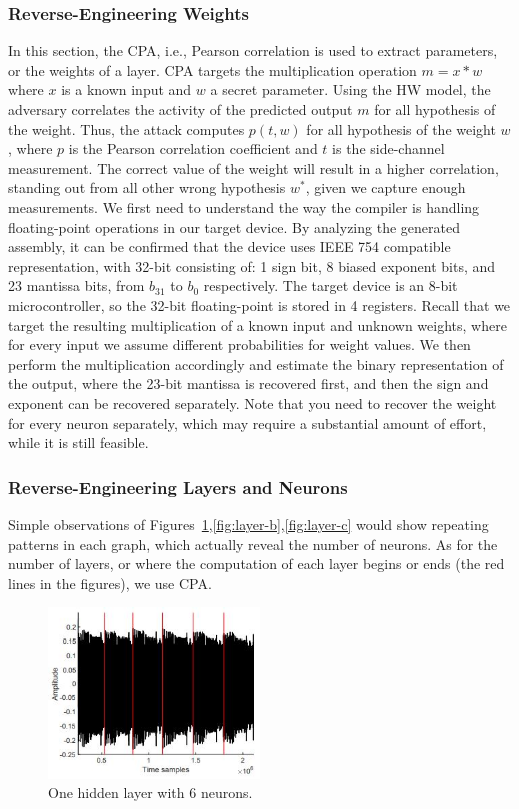 \subsubsection{Reverse-Engineering Weights}
In this section, the CPA, i.e., Pearson correlation is used to extract parameters, or the weights of a layer.
CPA targets the multiplication operation $m=x*w$ where $x$ is a known input and $w$ a secret parameter.
Using the HW model, the adversary correlates the activity of the predicted output $m$ for all hypothesis of the weight.
Thus, the attack computes $p(t, w)$ for all hypothesis of the weight $w$, where $p$ is the Pearson correlation coefficient and $t$ is the side-channel measurement.
The correct value of the weight will result in a higher correlation, standing out from all other wrong hypothesis $w^*$, given we capture enough measurements.
We first need to understand the way the compiler is handling floating-point operations in our target device.
By analyzing the generated assembly, it can be confirmed that the device uses IEEE 754 compatible representation, with 32-bit consisting of: 1 sign bit, 8 biased exponent bits, and 23 mantissa bits, from $b_31$ to $b_0$ respectively.
The target device is an 8-bit microcontroller, so the 32-bit floating-point is stored in 4 registers.
Recall that we target the resulting multiplication of a known input and unknown weights, where for every input we assume different probabilities for weight values.
We then perform the multiplication accordingly and estimate the binary representation of the output, where the 23-bit mantissa is recovered first, and then the sign and exponent can be recovered separately.
Note that you need to recover the weight for every neuron separately, which may require a substantial amount of effort, while it is still feasible.

\subsubsection{Reverse-Engineering Layers and Neurons}
Simple observations of Figures~\ref{fig:layer-a},\ref{fig:layer-b},\ref{fig:layer-c} would show repeating patterns in each graph, which actually reveal the number of neurons.
As for the number of layers, or where the computation of each layer begins or ends (the red lines in the figures), we use CPA.

\begin{figure}
    \centering
    \includegraphics[width=0.5\textwidth]{images/chapter8/layer-a.JPG}
    \caption{One hidden layer with 6 neurons.}
    \label{fig:layer-a}
\end{figure}

